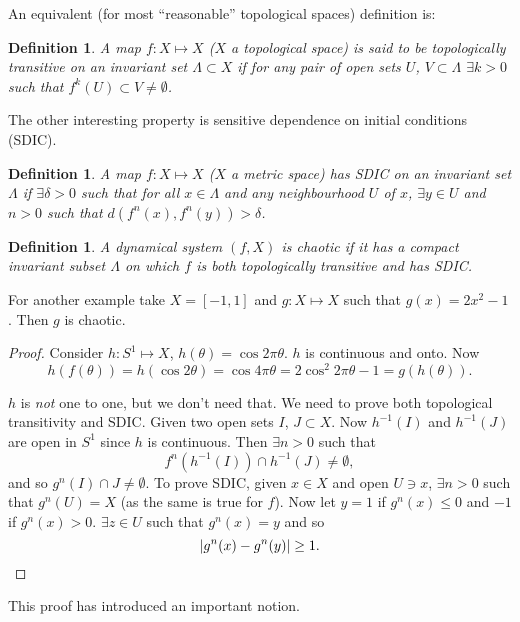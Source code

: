 \documentclass{notes}
\theoremstyle{plain}
\newtheorem{definition}[proposition]{Definition}
\begin{document}
An equivalent (for most ``reasonable'' topological spaces) definition is:

\begin{definition}
  A map $f \colon X \mapsto X$ ($X$ a topological space) is said to be
  \emph{topologically transitive} on an invariant set $\Lambda \subset
  X$ if for any pair of open sets $U$, $V \subset \Lambda$ $\exists k
  > 0$ such that $f^k(U) \subset V \neq \emptyset$.
\end{definition}

The other interesting property is sensitive dependence on initial conditions
(SDIC).

\begin{definition}
  A map $f \colon X \mapsto X$ ($X$ a metric space) has SDIC on an
  invariant set $\Lambda$ if $\exists \delta > 0$ such that for all $x
  \in \Lambda$ and any neighbourhood $U$ of $x$, $\exists y \in U$ and
  $n > 0$ such that $d(f^n(x),f^n(y))>\delta$.
\end{definition}

\begin{definition}
  A dynamical system $(f,X)$ is \emph{chaotic} if it has a compact
  invariant subset $\Lambda$ on which $f$ is both topologically
  transitive and has SDIC.
\end{definition}

For another example take $X = [-1,1]$ and $g \colon X \mapsto X$ such
that $g(x) = 2x^2 - 1$.  Then $g$ is chaotic.\label{page:2x2m1}

\begin{proof}
Consider $h \colon S^1 \mapsto X$, $h(\theta) = \cos 2 \pi \theta$.
$h$ is continuous and onto. Now
\[
h(f(\theta)) = h(\cos 2 \theta) = \cos 4 \pi \theta
= 2 \cos^2 2 \pi \theta -1 = g(h(\theta)). 
\]

$h$ is \emph{not} one to one, but we don't need that.  We need to prove
both topological transitivity and SDIC.  Given two open sets $I$, $J
\subset X$.  Now $h^{-1}(I)$ and $h^{-1}(J)$ are open in $S^1$ since
$h$ is continuous.  Then $\exists n > 0$ such that
\[
f^n(h^{-1}(I)) \cap h^{-1}(J) \neq \emptyset,
\]
and so $g^n(I) \cap J \neq \emptyset$.  To prove SDIC, given $x \in X$
and open $U \ni x$, $\exists n > 0$ such that $g^n(U) = X$ (as the same is
true for $f$).  Now let $y = 1$ if $g^{n}(x) \le 0$ and $-1$ if
$g^n(x) > 0$.  $\exists z \in U$ such that $g^n(x) = y$ and so
\[
\left|g^n(x) - g^n(y)\right| \ge 1.
\]
\end{proof}

This proof has introduced an important notion.
\end{document}
